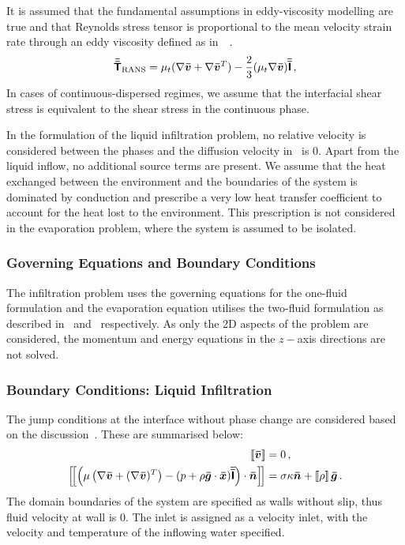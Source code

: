 It is assumed that the fundamental assumptions in eddy-viscosity modelling are
true and that Reynolds stress tensor is proportional 
to the mean velocity strain rate through an eddy viscosity defined as in~~\cite{star-ccm+}.
\begin{equation}
  {\bm{\bar{\bar{\mathsf{T}}}}}_{\text{RANS}} = \mu_{t} (\nabla \bm{\bar{v}} + \nabla \bm{\bar{v}}^{T}) - \frac{2}{3}(\mu_{t} \nabla \bm{\bar{v}}) {\bm{\bar{\bar{\mathsf{I}}}}}\,,
\end{equation}
In cases of continuous-dispersed regimes, we
assume that the interfacial shear stress is equivalent to the shear stress in the continuous phase.

In the formulation of the liquid infiltration problem, no relative velocity is considered 
between the phases and the diffusion velocity in~ is 0. Apart from the 
liquid inflow, no additional source terms are present. We assume that the heat exchanged 
between the environment and the boundaries of the system is dominated by conduction
and prescribe a very low heat transfer coefficient to account for the heat lost to the environment.
This prescription is not considered in the evaporation problem, where the system is assumed 
to be isolated.

\subsubsection{Governing Equations and Boundary Conditions}
The infiltration problem uses the governing equations for the one-fluid formulation
 and the evaporation equation utilises the two-fluid formulation
 as described in~ and~ respectively.
 As only the 2D aspects of the problem are considered, 
 the momentum and energy equations in the $z-$axis directions
 are not solved.

\subsubsection*{Boundary Conditions: Liquid Infiltration}\par\vspace{-\baselineskip}\vspace{\parskip}
The jump conditions at the interface without phase change are considered based on the discussion~.
These are summarised below:
\begin{subequations}
  \begin{align}
    \left[\! \left[\bm{\bar{v}} \right]\! \right] &= 0\,, \\
    \left[\! \left[ \left(\mu \left(\nabla \bm{\bar{v}} + (\nabla \bm{\bar{v}})^{T} \right) - (p + \rho \bm{\bar{g}} \cdot \bm{\bar{x}}) {\bm{\bar{\bar{\mathsf{I}}}}} 
    \right) \cdot \bm{\bar{n}} \right] \! \right] &= \sigma \kappa \bm{\bar{n}} + \left[\! \left[\rho \right]\! \right] \bm{\bar{g}}\,.
  \end{align}
\end{subequations}
The domain boundaries of the system are specified as walls without slip, thus 
 fluid velocity at wall is 0. The inlet is assigned as a velocity inlet, with
 the velocity and temperature of the inflowing water specified.

